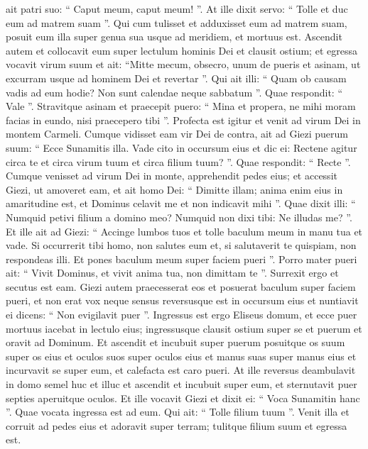 \begin{biblechapter}
\begin{biblechapter}
\begin{biblechapter}
\begin{biblechapter}
\verse ait patri suo: “ Caput meum, caput meum! ”. At ille dixit servo: “ Tolle et duc eum ad matrem suam ”. 
\verse Qui cum tulisset et adduxisset eum ad matrem suam, posuit eum illa super genua sua usque ad meridiem, et mortuus est. 
\verse Ascendit autem et collocavit eum super lectulum hominis Dei et clausit ostium; et egressa 
\verse vocavit virum suum et ait: “Mitte mecum, obsecro, unum de pueris et asinam, ut excurram usque ad hominem Dei et revertar ”. 
\verse Qui ait illi: “ Quam ob causam vadis ad eum hodie? Non sunt calendae neque sabbatum ”. Quae respondit: “ Vale ”. 
\verse Stravitque asinam et praecepit puero: “ Mina et propera, ne mihi moram facias in eundo, nisi praecepero tibi ”.
 \verse Profecta est igitur et venit ad virum Dei in montem Carmeli. Cumque vidisset eam vir Dei de contra, ait ad Giezi puerum suum: “ Ecce Sunamitis illa. 
\verse Vade cito in occursum eius et dic ei: Rectene agitur circa te et circa virum tuum et circa filium tuum? ”. Quae respondit: “ Recte ”. 
\verse Cumque venisset ad virum Dei in monte, apprehendit pedes eius; et accessit Giezi, ut amoveret eam, et ait homo Dei: “ Dimitte illam; anima enim eius in amaritudine est, et Dominus celavit me et non indicavit mihi ”.
 \verse Quae dixit illi: “ Numquid petivi filium a domino meo? Numquid non dixi tibi: Ne illudas me? ”. 
\verse Et ille ait ad Giezi: “ Accinge lumbos tuos et tolle baculum meum in manu tua et vade. Si occurrerit tibi homo, non salutes eum et, si salutaverit te quispiam, non respondeas illi. Et pones baculum meum super faciem pueri ”. 
\verse Porro mater pueri ait: “ Vivit Dominus, et vivit anima tua, non dimittam te ”. Surrexit ergo et secutus est eam. 
\verse Giezi autem praecesserat eos et posuerat baculum super faciem pueri, et non erat vox neque sensus reversusque est in occursum eius et nuntiavit ei dicens: “ Non evigilavit puer ”.
 \verse Ingressus est ergo Eliseus domum, et ecce puer mortuus iacebat in lectulo eius; 
\verse ingressusque clausit ostium super se et puerum et oravit ad Dominum. 
\verse Et ascendit et incubuit super puerum posuitque os suum super os eius et oculos suos super oculos eius et manus suas super manus eius et incurvavit se super eum, et calefacta est caro pueri. 
\verse At ille reversus deambulavit in domo semel huc et illuc et ascendit et incubuit super eum, et sternutavit puer septies aperuitque oculos. 
\verse Et ille vocavit Giezi et dixit ei: “ Voca Sunamitin hanc ”. Quae vocata ingressa est ad eum. Qui ait: “ Tolle filium tuum ”. 
\verse Venit illa et corruit ad pedes eius et adoravit super terram; tulitque filium suum et egressa est.

\end{biblechapter}
\end{biblechapter}
\end{biblechapter}
\end{biblechapter}
